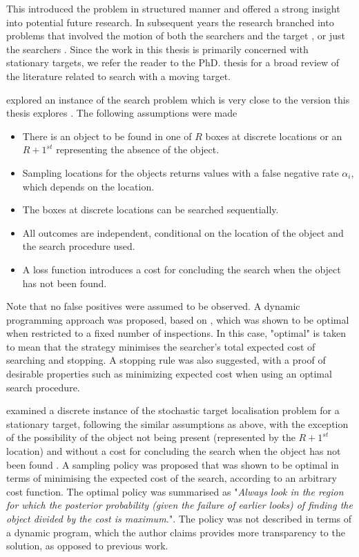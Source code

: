 \par This introduced the problem in structured manner and offered a strong insight into potential future research. In subsequent years the research branched into problems that involved the motion of both the searchers and the target \cite{Stone1980OptimalTargets}, or just the searchers \cite{Chew1966AProcedure}. Since the work in this thesis is primarily concerned with stationary targets, we refer the reader to the PhD. thesis \cite{Lau2007OptimalEnvironments} for a broad review of the literature related to search with a moving target. 

\citeauthor{Chew1966AProcedure} explored an instance of the search problem which is very close to the version this thesis explores \cite{Chew1966AProcedure}. The following assumptions were made
\begin{itemize}
    \item There is an object to be found in one of $R$ boxes at discrete locations or an $R+1^{st}$ representing the absence of the object.
    \item Sampling locations for the objects returns values with a false negative rate $\alpha_i$, which depends on the location.
    \item The boxes at discrete locations can be searched sequentially.
    \item All outcomes are independent, conditional on the location of the object and the search procedure used.
    \item A loss function introduces a cost for concluding the search when the object has not been found.
\end{itemize}
Note that no false positives were assumed to be observed. A dynamic programming approach was proposed, based on \cite{Blackwell1962DiscreteProgramming}, which was shown to be optimal when restricted to a fixed number of inspections. In this case, "optimal" is taken to mean that the strategy minimises the searcher's total expected cost of searching and stopping. A stopping rule was also suggested, with a proof of desirable properties such as minimizing expected cost when using an optimal search procedure.

\citeauthor{Black1965DiscreteSearch} examined a discrete instance of the stochastic target localisation problem for a stationary target, following the similar assumptions as \cite{Chew1966AProcedure} above, with the exception of the possibility of the object not being present (represented by the $R+1^{st}$ location) and without a cost for concluding the search when the object has not been found \cite{Black1965DiscreteSearch}. A sampling policy was proposed that was shown to be optimal in terms of minimising the expected cost of the search, according to an arbitrary cost function. The optimal policy was summarised as "\textit{Always look in the region for which the posterior probability (given the failure of earlier looks) of finding the object divided by the cost is maximum.}". The policy was not described in terms of a dynamic program, which the author claims provides more transparency to the solution, as opposed to previous work.

